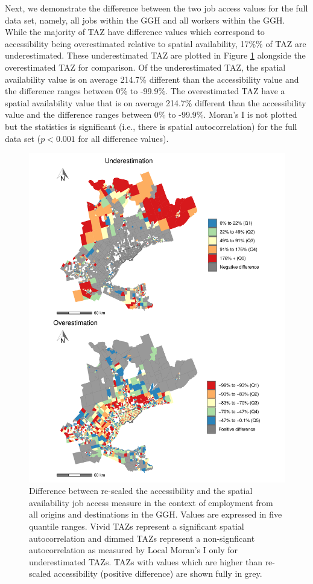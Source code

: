 \documentclass[]{elsarticle} %
\begin{document}
Next, we demonstrate the difference between the two job access values
for the full data set, namely, all jobs within the GGH and all workers
within the GGH. While the majority of TAZ have difference values which
correspond to accessibility being overestimated relative to spatial
availability, 17\%\% of TAZ are underestimated. These underestimated TAZ
are plotted in Figure \ref{fig:plot-difference-GGH} alongside the
overestimated TAZ for comparison. Of the underestimated TAZ, the spatial
availability value is on average 214.7\% different than the
accessibility value and the difference ranges between 0\% to -99.9\%.
The overestimated TAZ have a spatial availability value that is on
average 214.7\% different than the accessibility value and the
difference ranges between 0\% to -99.9\%. Moran's I is not plotted but
the statistics is significant (i.e., there is spatial autocorrelation)
for the full data set (\(p< 0.001\) for all difference values).

\begin{figure}
\includegraphics[width=1\linewidth]{Spatial-Availability_files/figure-latex/plot-difference-GGH-1} \caption{\label{fig:plot-difference-GGH}Difference between re-scaled the accessibility and the spatial availability job access measure in the context of employment from all origins and destinations in the GGH. Values are expressed in five quantile ranges. Vivid TAZs represent a significant spatial autocorrelation and dimmed TAZs represent a non-signficant autocorrelation as measured by Local Moran's I only for underestimated TAZs. TAZs with values which are higher than re-scaled accessibility (positive difference) are shown fully in grey.}\label{fig:plot-difference-GGH}
\end{figure}
\end{document}
